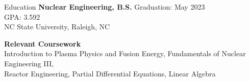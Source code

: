 \begin{ResumeSection}{Education}
    \smallskip
    {\bf 
        Nuclear Engineering, B.S.
    } 
    \hfill 
    Graduation: May 2023
    \\ 
    \hfill 
    GPA: 3.592
    \\ 
    NC State University, Raleigh, NC 
    \bigskip
    
    {\bf
        Relevant Coursework
    } 
    \\
    Introduction to Plasma Physics and Fusion Energy,  
    Fundamentals of Nuclear Engineering III, 
    \\
    Reactor Engineering, 
    Partial Differential Equations,
    Linear Algebra
\end{ResumeSection}